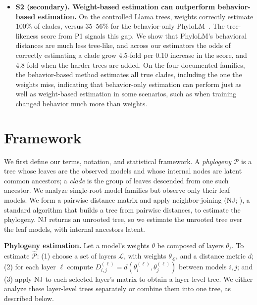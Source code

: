 \documentclass{article}
\theoremstyle{definition}
\theoremstyle{plain}
\newif\ifrevision
\newcommand{\rev}[1]{\ifrevision{\color{blue}#1}\else#1\fi}
\newcommand{\revtag}[1]{\ifrevision\textsuperscript{\color{blue}\sffamily\scriptsize[#1]}\fi}
\begin{document}
\begin{itemize}[leftmargin=1.3em,itemsep=1pt,topsep=2pt,parsep=0pt]
  \item \textbf{S2 (secondary). Weight-based estimation can outperform behavior-based estimation.} On the controlled Llama trees, weights correctly estimate 100\% of clades, versus 35--56\% for the behavior-only PhyloLM~\citep{yax2025phylolm}. The tree-likeness score from P1 signals this gap. We show that PhyloLM's behavioral distances are much less tree-like, and across our estimators the odds of correctly estimating a clade grow 4.5-fold per 0.10 increase in the score\rev{, and 4.8-fold when the harder trees are added}.\revtag{tWEn W1, W2; S8sV Q2} On the \rev{four}\revtag{S8sV} documented families, the behavior-based method estimates all true clades\rev{, including the one the weights miss}, indicating that behavior-only estimation can perform just as well as weight-based estimation in some scenarios\rev{, such as when training changed behavior much more than weights}.
\end{itemize}








\section{Framework}
\label{sec:framework}

We first define our terms, notation, and statistical framework. A \emph{phylogeny} $\mathcal{P}$ is a tree
whose leaves are the observed models and whose internal nodes are latent common ancestors; a
\emph{clade} is the group of leaves descended from one such ancestor. We analyze
single-root model families but observe only their leaf models. We form a pairwise distance matrix and apply neighbor-joining (NJ;
\citealp{saitou1987neighbor}), a standard algorithm that builds a tree from pairwise distances, to estimate the phylogeny. NJ returns an unrooted tree, so we estimate the unrooted tree over the leaf models, with internal ancestors latent.

\textbf{Phylogeny estimation.}\label{sec:framework:phylo}
Let a model's weights $\theta$ be composed of layers $\theta_\ell$. To estimate $\widehat{\mathcal{P}}$: (1) choose a set of layers \rev{$\mathcal{L}$, with weights $\theta_\mathcal{L}$,}\revtag{FgwB} and a distance metric $d$;
(2) for each layer $\ell$ compute $D_{i,j}^{(\ell)} = d(\theta^{(\ell)}_i, \theta^{(\ell)}_j)$ between models
$i,j$; and (3) apply NJ to each selected layer's matrix to obtain a layer-level tree. We either
analyze these layer-level trees separately or combine them into one tree, as described below.
\end{document}
